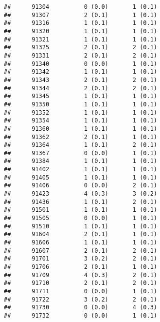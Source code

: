 \documentclass[]{article}
\begin{document}
\begin{verbatim}
##      91304          0 (0.0)       1 (0.1)                       
##      91307          2 (0.1)       1 (0.1)                       
##      91316          1 (0.1)       1 (0.1)                       
##      91320          1 (0.1)       1 (0.1)                       
##      91321          1 (0.1)       1 (0.1)                       
##      91325          2 (0.1)       2 (0.1)                       
##      91331          2 (0.1)       2 (0.1)                       
##      91340          0 (0.0)       1 (0.1)                       
##      91342          1 (0.1)       1 (0.1)                       
##      91343          2 (0.1)       2 (0.1)                       
##      91344          2 (0.1)       2 (0.1)                       
##      91345          1 (0.1)       1 (0.1)                       
##      91350          1 (0.1)       1 (0.1)                       
##      91352          1 (0.1)       1 (0.1)                       
##      91354          1 (0.1)       1 (0.1)                       
##      91360          1 (0.1)       1 (0.1)                       
##      91362          2 (0.1)       1 (0.1)                       
##      91364          1 (0.1)       2 (0.1)                       
##      91367          0 (0.0)       1 (0.1)                       
##      91384          1 (0.1)       1 (0.1)                       
##      91402          1 (0.1)       1 (0.1)                       
##      91405          1 (0.1)       1 (0.1)                       
##      91406          0 (0.0)       2 (0.1)                       
##      91423          4 (0.3)       3 (0.2)                       
##      91436          1 (0.1)       2 (0.1)                       
##      91501          1 (0.1)       1 (0.1)                       
##      91505          0 (0.0)       1 (0.1)                       
##      91510          1 (0.1)       1 (0.1)                       
##      91604          2 (0.1)       1 (0.1)                       
##      91606          1 (0.1)       1 (0.1)                       
##      91607          2 (0.1)       2 (0.1)                       
##      91701          3 (0.2)       2 (0.1)                       
##      91706          2 (0.1)       1 (0.1)                       
##      91709          4 (0.3)       2 (0.1)                       
##      91710          2 (0.1)       2 (0.1)                       
##      91711          0 (0.0)       1 (0.1)                       
##      91722          3 (0.2)       2 (0.1)                       
##      91730          0 (0.0)       4 (0.3)                       
##      91732          0 (0.0)       1 (0.1)                       

\end{verbatim}
\end{document}
